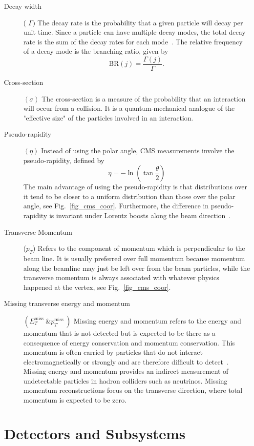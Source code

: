 \begin{description}
	\item[Decay width] ( $\Gamma)$ The decay rate is the probability that a given particle will decay per unit time. Since a particle can have multiple decay modes, the total decay rate is the sum of the decay rates for each mode~\parencite{book:1123430}. The relative frequency of a decay mode is the branching ratio, given by
	$$
	\mathrm{BR}(j)=\frac{\Gamma(j)}{\Gamma} .
	$$
	\item[Cross-section] $(\sigma)$ The cross-section is a measure of the probability that an interaction will occur from a collision. It is a quantum-mechanical analogue of the "effective size" of the particles involved in an interaction.

	\item[Pseudo-rapidity] $(\eta)$ Instead of using the polar angle, CMS measurements involve the pseudo-rapidity, defined by
	$$
	\eta=-\ln \left(\tan \frac{\theta}{2}\right)
	$$
	The main advantage of using the pseudo-rapidity is that distributions over it tend to be closer to a uniform distribution than those over the polar angle, see Fig.~\ref{fig_cms_coor}. Furthermore, the difference in pseudo-rapidity is invariant under Lorentz boosts along the beam direction~\parencite{book:1123430}.
	\item[Transverse Momentum] ($p_T$) Refers to the component of momentum which is perpendicular to the beam line. It is usually preferred over full momentum because momentum along the beamline may just be left over from the beam particles, while the transverse momentum is always associated with whatever physics happened at the vertex, see Fig.~\ref{fig_cms_coor}.
	\item[Missing transverse energy and momentum] $\left(E_{T}^{\text {miss }} \& p_{T}^{\text {miss }}\right)$ Missing energy and momentum refers to the energy and momentum that is not detected but is expected to be there as a consequence of energy conservation and momentum conservation. This momentum is often carried by particles that do not interact electromagnetically or strongly and are therefore difficult to detect~\parencite{book:1123430}. Missing energy and momentum provides an indirect measurement of undetectable particles in hadron colliders such as neutrinos. Missing momentum reconstructions focus on the transverse direction, where total momentum is expected to be zero.
\end{description}


\section{Detectors and Subsystems}

